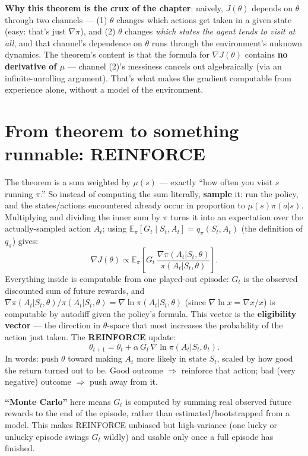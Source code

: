 \documentclass[11pt]{article}
\begin{document}
\textbf{Why this theorem is the crux of the chapter}: naively, $J(\theta)$ depends on
$\theta$ through two channels --- (1) $\theta$ changes which actions get taken in a given
state (easy: that's just $\nabla\pi$), and (2) $\theta$ changes \emph{which states the
agent tends to visit at all}, and that channel's dependence on $\theta$ runs through the
environment's unknown dynamics. The theorem's content is that the formula for
$\nabla J(\theta)$ contains \textbf{no derivative of $\mu$} --- channel (2)'s messiness
cancels out algebraically (via an infinite-unrolling argument). That's what makes the
gradient computable from experience alone, without a model of the environment.

\section*{From theorem to something runnable: REINFORCE}

The theorem is a sum weighted by $\mu(s)$ --- exactly ``how often you visit $s$ running
$\pi$.'' So instead of computing the sum literally, \textbf{sample} it: run the policy, and
the states/actions encountered already occur in proportion to $\mu(s)\pi(a|s)$. Multiplying
and dividing the inner sum by $\pi$ turns it into an expectation over the actually-sampled
action $A_t$; using $\mathbb E_\pi[G_t \mid S_t,A_t] = q_\pi(S_t,A_t)$ (the definition of
$q_\pi$) gives:
$$\nabla J(\theta) \propto \mathbb E_\pi\left[G_t\,\frac{\nabla\pi(A_t|S_t,\theta)}{\pi(A_t|S_t,\theta)}\right].$$
Everything inside is computable from one played-out episode: $G_t$ is the observed
discounted sum of future rewards, and
$\nabla\pi(A_t|S_t,\theta)/\pi(A_t|S_t,\theta) = \nabla\ln\pi(A_t|S_t,\theta)$
(since $\nabla\ln x = \nabla x / x$) is computable by autodiff given the policy's formula.
This vector is the \textbf{eligibility vector} --- the direction in $\theta$-space that
most increases the probability of the action just taken. The \textbf{REINFORCE} update:
$$\theta_{t+1} = \theta_t + \alpha\, G_t\, \nabla\ln\pi(A_t|S_t,\theta_t).$$
In words: push $\theta$ toward making $A_t$ more likely in state $S_t$, scaled by how good
the return turned out to be. Good outcome $\Rightarrow$ reinforce that action; bad
(very negative) outcome $\Rightarrow$ push away from it.

\textbf{``Monte Carlo''} here means $G_t$ is computed by summing real observed future
rewards to the end of the episode, rather than estimated/bootstrapped from a model. This
makes REINFORCE unbiased but high-variance (one lucky or unlucky episode swings $G_t$
wildly) and usable only once a full episode has finished.
\end{document}
